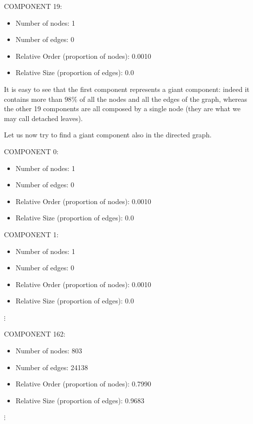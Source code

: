 \documentclass{report}
\theoremstyle{definition}
\theoremstyle{remark}
\begin{document}
COMPONENT 19:
\begin{itemize}
\item Number of nodes: 1
\item Number of edges: 0
\item Relative Order (proportion of nodes): 0.0010
\item Relative Size (proportion of edges): 0.0\\
\end{itemize}

It is easy to see that the first component represents a giant component: indeed it contains more than $98\%$ of all the nodes and all the edges of the graph, whereas the other 19 components are all composed by a single node (they are what we may call detached leaves).

Let us now try to find a giant component also in the directed graph.
\bigskip 

COMPONENT 0:
\begin{itemize}
	\item Number of nodes: 1
	\item Number of edges: 0
	\item Relative Order (proportion of nodes): 0.0010
	\item Relative Size (proportion of edges): 0.0\\
\end{itemize}

COMPONENT 1:
\begin{itemize}
	\item Number of nodes: 1
	\item Number of edges: 0
	\item Relative Order (proportion of nodes): 0.0010
	\item Relative Size (proportion of edges): 0.0\\
\end{itemize}

$\vdots$

COMPONENT 162:
\begin{itemize}
	\item Number of nodes: 803
	\item Number of edges: 24138
	\item Relative Order (proportion of nodes): 0.7990
	\item Relative Size (proportion of edges): 0.9683\\
\end{itemize}

$\vdots$
\end{document}
